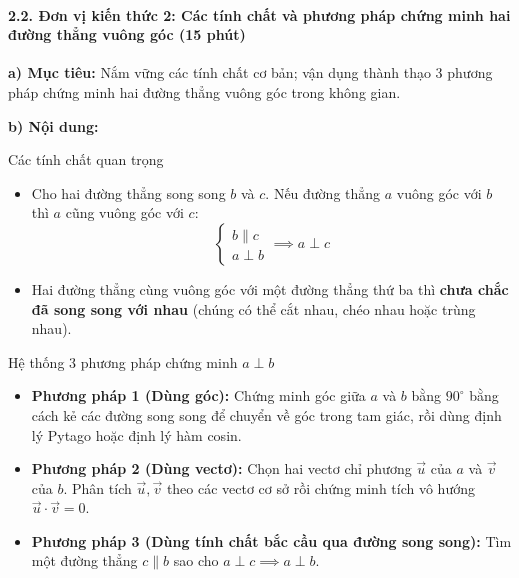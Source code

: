 \documentclass[12pt, a4paper]{article}
\renewcommand{\vec}[1]{\overrightarrow{#1}}
\begin{document}
\paragraph{2.2. Đơn vị kiến thức 2: Các tính chất và phương pháp chứng minh hai đường thẳng vuông góc (15 phút)}

\noindent \textbf{a) Mục tiêu:}
Nắm vững các tính chất cơ bản; vận dụng thành thạo 3 phương pháp chứng minh hai đường thẳng vuông góc trong không gian.

\noindent \textbf{b) Nội dung:}
\begin{pedabox}{Các tính chất quan trọng}
\begin{itemize}[leftmargin=0.6cm]
    \item Cho hai đường thẳng song song $b$ và $c$. Nếu đường thẳng $a$ vuông góc với $b$ thì $a$ cũng vuông góc với $c$:
    $$\begin{cases} b \parallel c \\ a \perp b \end{cases} \implies a \perp c$$
    \item Hai đường thẳng cùng vuông góc với một đường thẳng thứ ba thì \textbf{chưa chắc đã song song với nhau} (chúng có thể cắt nhau, chéo nhau hoặc trùng nhau).
\end{itemize}
\end{pedabox}

\begin{pedabox}{Hệ thống 3 phương pháp chứng minh $a \perp b$}
\begin{itemize}[leftmargin=0.6cm]
    \item \textbf{Phương pháp 1 (Dùng góc):} Chứng minh góc giữa $a$ và $b$ bằng $90^\circ$ bằng cách kẻ các đường song song để chuyển về góc trong tam giác, rồi dùng định lý Pytago hoặc định lý hàm cosin.
    \item \textbf{Phương pháp 2 (Dùng vectơ):} Chọn hai vectơ chỉ phương $\vec{u}$ của $a$ và $\vec{v}$ của $b$. Phân tích $\vec{u}, \vec{v}$ theo các vectơ cơ sở rồi chứng minh tích vô hướng $\vec{u} \cdot \vec{v} = 0$.
    \item \textbf{Phương pháp 3 (Dùng tính chất bắc cầu qua đường song song):} Tìm một đường thẳng $c \parallel b$ sao cho $a \perp c \implies a \perp b$.
\end{itemize}
\end{pedabox}
\end{document}
